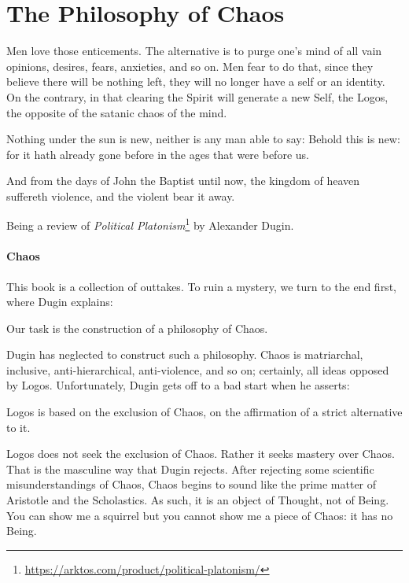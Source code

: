 \section{The Philosophy of Chaos}

\begin{quotex}
Men love those enticements. The alternative is to purge one's mind of all vain opinions, desires, fears, anxieties, and so on. Men fear to do that, since they believe there will be nothing left, they will no longer have a self or an identity. On the contrary, in that clearing the Spirit will generate a new Self, the Logos, the opposite of the satanic chaos of the mind. 

Nothing under the sun is new, neither is any man able to say: Behold this is new: for it hath already gone before in the ages that were before us. 

And from the days of John the Baptist until now, the kingdom of heaven suffereth violence, and the violent bear it away. 

\end{quotex}
Being a review of \textit{Political Platonism}\footnote{\url{https://arktos.com/product/political-platonism/}} by Alexander Dugin.

\paragraph{Chaos}
This book is a collection of outtakes. To ruin a mystery, we turn to the end first, where Dugin explains:

\begin{quotex}
Our task is the construction of a philosophy of Chaos. 

\end{quotex}
Dugin has neglected to construct such a philosophy. Chaos is matriarchal, inclusive, anti-hierarchical, anti-violence, and so on; certainly, all ideas opposed by Logos. Unfortunately, Dugin gets off to a bad start when he asserts:

\begin{quotex}
Logos is based on the exclusion of Chaos, on the affirmation of a strict alternative to it. 

\end{quotex}
Logos does not seek the exclusion of Chaos. Rather it seeks mastery over Chaos. That is the masculine way that Dugin rejects. After rejecting some scientific misunderstandings of Chaos, Chaos begins to sound like the prime matter of Aristotle and the Scholastics. As such, it is an object of Thought, not of Being. You can show me a squirrel but you cannot show me a piece of Chaos: it has no Being.


